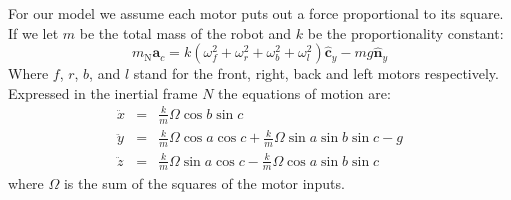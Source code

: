 \documentclass[lettersize,journal]{IEEEtran}
\begin{document}
For our model we assume each motor puts out a force proportional to its square. If we let $m$ be the total mass of the robot and $k$ be the proportionality constant:
\begin{equation}
  m{_\mathrm{N}\mathbf{a}_c} = k \left(\omega_f^2 + \omega_r^2 + \omega_b^2 + \omega_l^2\right) \mathbf{\hat{c}}_y - mg \mathbf{\hat{n}}_y
\end{equation}
Where $f$, $r$, $b$, and $l$ stand for the front, right, back and left motors respectively. Expressed in the inertial frame $N$ the equations of motion are:
\begin{eqnarray}
  \ddot{x} &=& \frac{k}{m} \Omega \cos b \sin c \\
  \ddot{y} &=& \frac{k}{m} \Omega \cos a \cos c + \frac{k}{m} \Omega \sin a \sin b \sin c - g\\
  \ddot{z} &=& \frac{k}{m} \Omega \sin a \cos c - \frac{k}{m} \Omega \cos a \sin b \sin c 
\end{eqnarray}
where $\Omega$ is the sum of the squares of the motor inputs.








% 





\end{document}
